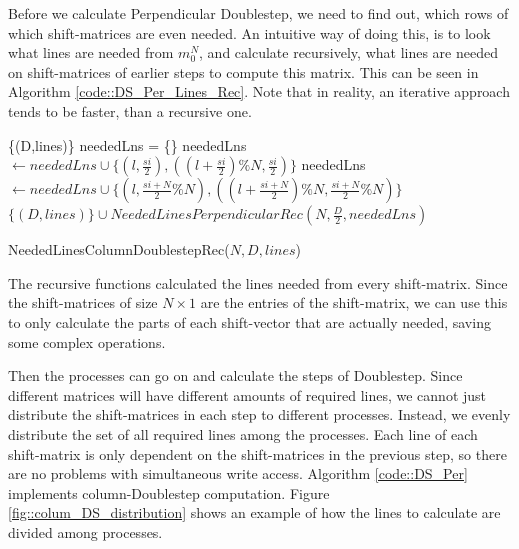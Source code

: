 \documentclass[12pt]{article}
\begin{document}
Before we calculate Perpendicular Doublestep, we need to find out, which rows of which shift-matrices are even needed. An intuitive way of doing this, is to look what lines are needed from $m_0^N$, and calculate recursively, what lines are needed on shift-matrices of earlier steps to compute this matrix. This can be seen in Algorithm \ref{code::DS_Per_Lines_Rec}. Note that in reality, an iterative approach tends to be faster, than a recursive one.\\


\begin{algorithm}
	\begin{algorithmic}[1]
			\State \Return \{(D,lines)\}
		\EndIf
		\State neededLns = \{\}
			\State neededLns $\leftarrow neededLns \cup \{(l,\frac{si}{2}),((l+\frac{si}{2})\%N,\frac{si}{2})\}$
			\State neededLns $\leftarrow neededLns \cup \{(l,\frac{si+N}{2}\%N),((l+\frac{si+N}{2})\%N,\frac{si+N}{2}\%N)\}$	
		\EndFor
		\State \Return $\{(D,lines)\} \cup NeededLinesPerpendicularRec(N,\frac{D}{2},neededLns)$
	\end{algorithmic}
\caption{NeededLinesColumnDoublestepRec($N,D,lines$)}\label{euclid}
\label{code::DS_Per_Lines_Rec}
\end{algorithm}


The recursive functions calculated the lines needed from every shift-matrix. Since the shift-matrices of size $N\times1$ are the entries of the shift-matrix, we can use this to only calculate the parts of each shift-vector that are actually needed, saving some complex operations.

Then the processes can go on and calculate the steps of Doublestep. Since different matrices will have different amounts of required lines, we cannot just distribute the shift-matrices in each step to different processes. Instead, we evenly distribute the set of all required lines among the processes. Each line of each shift-matrix is only dependent on the shift-matrices in the previous step, so there are no problems with simultaneous write access. Algorithm \ref{code::DS_Per} implements column-Doublestep computation. Figure \ref{fig::colum_DS_distribution} shows an example of how  the lines to calculate are divided among processes.
\end{document}
